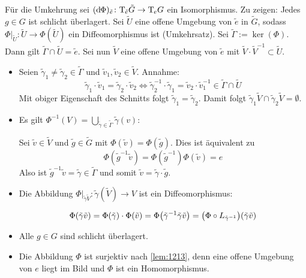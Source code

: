 \begin{beweis}
\begin{enumerate}[(1)]
        Für die Umkehrung sei $(\mathrm{d}\mkern-1.0mu \Phi)_{\tilde{e}} \colon \mathrm{T}\mkern-0.85mu_{\tilde{e}} \tilde{G} \to \mathrm{T}\mkern-0.85mu_e G$ ein Isomorphismus.
        Zu zeigen: Jedes $g \in G$ ist schlicht überlagert.
        Sei $\tilde{U}$ eine offene Umgebung von $\tilde{e}$ in $\tilde{G}$, sodass $\Phi|_{\tilde{U}} \colon \tilde{U} \to \Phi(\tilde{U})$ ein Diffeomorphismus ist (Umkehrsatz).
        Sei $\tilde{\Gamma} := \ker (\Phi)$.
        Dann gilt $\tilde{\Gamma} \cap \tilde{U}= \tilde{e}$.
        Sei nun $\tilde{V}$ eine offene Umgebung von $\tilde{e}$ mit $\tilde{V} \cdot \tilde{V}^{-1} \subset \tilde{U}$.
        \begin{itemize}
            \item  Seien $\tilde{\gamma}_1 \neq \tilde{\gamma}_2 \in \tilde{\Gamma}$ und $\tilde{v}_1, \tilde{v}_2 \in \tilde{V}$.
            Annahme:
            \[
                \tilde{\gamma}_1 \cdot \tilde{v}_1 = \tilde{\gamma}_2 \cdot \tilde{v}_2 \iff \tilde{\gamma}_2^{-1} \cdot \tilde{\gamma}_1 = \tilde{v}_2 \cdot \tilde{v}_1^{-1} \in \tilde{\Gamma} \cap \tilde{U}
            \]
            Mit obiger Eigenschaft des Schnitts folgt $\tilde{\gamma}_1 = \tilde{\gamma}_2$.
            Damit folgt $\tilde{\gamma}_1 \tilde{V} \cap \tilde{\gamma}_2 \tilde{V} = \emptyset$.
            \item Es gilt $\Phi^{-1}(V) = \bigcup_{\tilde{\gamma} \in \tilde{\Gamma}} \tilde{\gamma}(v)$:
            
            Sei $\tilde{v} \in  \tilde{V}$ und $\tilde{g} \in \tilde{G}$ mit $\Phi(\tilde{v}) = \Phi(\tilde{g})$.
            Dies ist äquivalent zu
            \[
                \Phi(\tilde{g}^{-1} \tilde{v}) = \Phi(\tilde{g}^{-1}) \Phi(\tilde{v}) = e
            \]
            Also ist $\tilde{g}^{-1} \tilde{v} = \tilde{\gamma} \in \tilde{\Gamma}$ und somit $\tilde{v} = \tilde{\gamma} \cdot \tilde{g}$.
            \item Die Abbildung $\Phi|_{\tilde{\gamma} \tilde{V}} \colon \tilde{\gamma}(\tilde{V}) \to V$ ist ein Diffeomorphismus:
            
            \[
                \Phi(\tilde{\gamma} \tilde{v}) = \Phi(\tilde{\gamma}) \cdot \Phi(\tilde{v}) = \Phi \enbrace*{\tilde{\gamma}^{-1} \tilde{\gamma} \tilde{v}} = \enbrace*{\Phi \circ L_{\tilde{\gamma}^{-1}}} (\tilde{\gamma} \tilde{v})
            \]
            \item Alle $g \in G$ sind schlicht überlagert.
            \item Die Abbildung $\Phi$ ist surjektiv nach \autoref{lem:1213}, denn eine offene Umgebung von $e$ liegt im Bild und $\Phi$ ist ein Homomorphismus.\qedhere
        \end{itemize}
    \end{enumerate}
\end{beweis}

